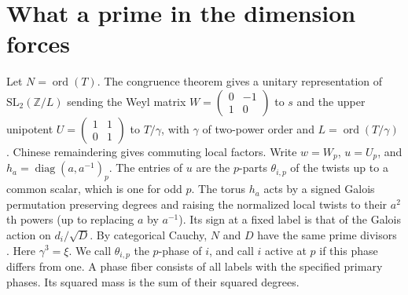 \documentclass[11pt]{amsart}
\numberwithin{equation}{section}
\newcommand{\ZZ}{\mathbb Z}
\begin{document}
\section{What a prime in the dimension forces}\label{blk:section}
Let $N=\operatorname{ord}(T)$. The congruence theorem gives a unitary
representation of $\mathrm{SL}_2(\ZZ/L)$ sending the Weyl matrix
$W=\left(\begin{smallmatrix}0&-1\\1&0\end{smallmatrix}\right)$ to $s$ and
the upper unipotent $U=\left(\begin{smallmatrix}1&1\\0&1\end{smallmatrix}\right)$
to $T/\gamma$, with $\gamma$ of two-power order and $L=\operatorname{ord}(T/\gamma)$
\cite[Theorems II and 6.10]{DLNCongruence}. Chinese remaindering gives
commuting local factors. Write $w=W_p$, $u=U_p$, and
$h_a=\operatorname{diag}(a,a^{-1})_p$. The entries of $u$ are the
$p$-parts $\theta_{i,p}$ of the twists up to a common scalar, which is one
for odd $p$. The torus $h_a$ acts by a signed Galois permutation preserving
degrees and raising the normalized local twists to their $a^2$th powers
(up to replacing $a$ by $a^{-1}$). Its sign at a fixed label is that of
the Galois action on $d_i/\sqrt D$. By categorical Cauchy, $N$ and $D$
have the same prime divisors \cite[Theorem~3.9]{BNRWFinite}. Here
$\gamma^3=\xi$. We call $\theta_{i,p}$ the $p$-phase of $i$, and call
$i$ active at $p$ if this phase differs from one. A phase fiber consists
of all labels with the specified primary phases. Its squared mass is the
sum of their squared degrees.
\end{document}
